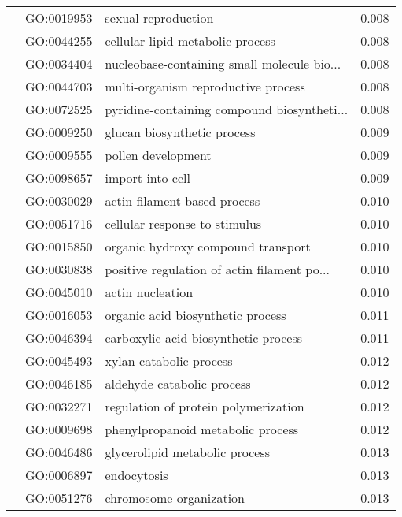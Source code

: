 \begin{longtable}{lllr}
   & GO:0019953 &                          sexual reproduction &         0.008 \\
   & GO:0044255 &             cellular lipid metabolic process &         0.008 \\
   & GO:0034404 &  nucleobase-containing small molecule bio... &         0.008 \\
   & GO:0044703 &          multi-organism reproductive process &         0.008 \\
   & GO:0072525 &  pyridine-containing compound biosyntheti... &         0.008 \\
   & GO:0009250 &                  glucan biosynthetic process &         0.009 \\
   & GO:0009555 &                           pollen development &         0.009 \\
   & GO:0098657 &                             import into cell &         0.009 \\
   & GO:0030029 &                 actin filament-based process &         0.010 \\
   & GO:0051716 &                cellular response to stimulus &         0.010 \\
   & GO:0015850 &           organic hydroxy compound transport &         0.010 \\
   & GO:0030838 &  positive regulation of actin filament po... &         0.010 \\
   & GO:0045010 &                             actin nucleation &         0.010 \\
   & GO:0016053 &            organic acid biosynthetic process &         0.011 \\
   & GO:0046394 &         carboxylic acid biosynthetic process &         0.011 \\
   & GO:0045493 &                      xylan catabolic process &         0.012 \\
   & GO:0046185 &                   aldehyde catabolic process &         0.012 \\
   & GO:0032271 &         regulation of protein polymerization &         0.012 \\
   & GO:0009698 &            phenylpropanoid metabolic process &         0.012 \\
   & GO:0046486 &               glycerolipid metabolic process &         0.013 \\
   & GO:0006897 &                                  endocytosis &         0.013 \\
   & GO:0051276 &                      chromosome organization &         0.013 \\

\end{longtable}
